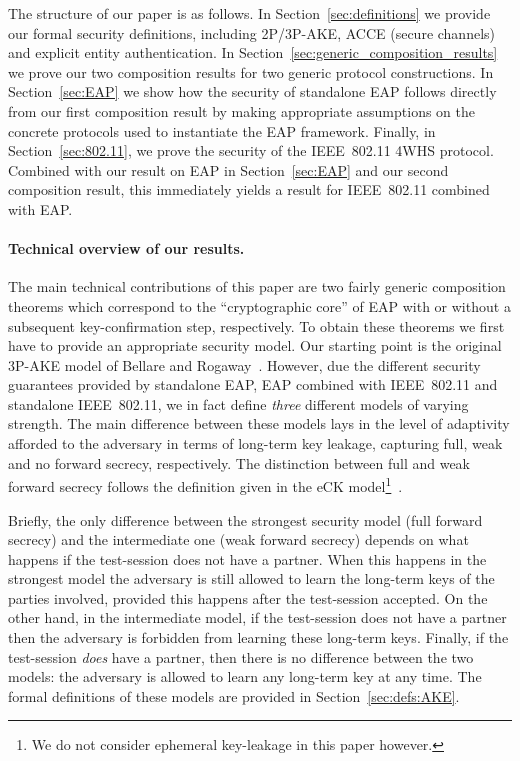 The structure of our paper is as follows.
In Section~\ref{sec:definitions} we provide our formal security definitions,
including 2P/3P-AKE, ACCE (secure channels) and explicit entity authentication.
In Section~\ref{sec:generic_composition_results} we prove our two composition results for two generic protocol constructions.
In Section~\ref{sec:EAP} we show how the security of standalone EAP follows directly from  our first composition result by making appropriate assumptions on the concrete protocols used to instantiate the EAP framework.
Finally, in Section~\ref{sec:802.11},
we prove the security of the IEEE~802.11 4WHS protocol.
Combined with our result on EAP in Section~\ref{sec:EAP} and our second composition result,
this immediately yields a result for IEEE~802.11 combined with EAP.




\paragraph{Technical overview of our results.}
The main technical contributions of this paper are two fairly generic composition theorems which correspond to the ``cryptographic core'' of EAP with or without a subsequent key-confirmation step, respectively. 
To obtain these theorems we first have to provide an appropriate security model.
Our starting point is the original 3P-AKE model of Bellare and Rogaway~\cite{STOC:BelRog95}.
However,
due the different security guarantees provided by standalone EAP,
EAP combined with IEEE~802.11 and standalone IEEE~802.11,
we in fact define \emph{three} different models of varying strength.
The main difference between these models lays in the level of adaptivity afforded to the adversary in terms of long-term key leakage,
capturing full, weak and no forward secrecy,
respectively. 
The distinction between full and weak forward secrecy follows the definition given in the eCK model\footnote{We 
do not consider ephemeral key-leakage in this paper however.}~\cite{EPRINT:LaMLauMit06}.
 

Briefly,
the only difference between the strongest security model (full forward secrecy) and the intermediate one
(weak forward secrecy) depends on what happens if the test-session does not have a partner.
When this happens in the strongest model the adversary is still allowed to learn the long-term keys of the parties involved,
provided this happens after the test-session accepted.
On the other hand,
in the intermediate model,
if the test-session does not have a partner then the adversary is forbidden from learning these long-term keys.
Finally,
if the test-session \emph{does} have a partner,
then there is no difference between the two models:
the adversary is allowed to learn any long-term key at any time.
The formal definitions of these models are provided in Section~\ref{sec:defs:AKE}.
	
